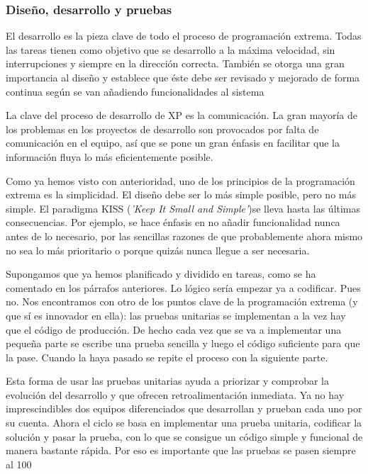 \documentclass[12pt]{book} %
\begin{document}
		\subsubsection{Diseño, desarrollo y pruebas}
			El desarrollo es la pieza clave de todo el proceso de programación extrema. Todas las tareas tienen como objetivo que se
			desarrollo a la máxima velocidad, sin 	interrupciones y siempre en la dirección correcta. 
			También se otorga una gran importancia al diseño y establece que éste debe ser revisado y mejorado de forma continua según se
			van añadiendo funcionalidades al sistema
			
			La clave del proceso de desarrollo de XP es la comunicación. La gran mayoría de los problemas en los proyectos de desarrollo son
			provocados por falta de comunicación en el equipo, así que se pone un gran énfasis en facilitar que la información fluya lo más
			eficientemente posible. 
			
			Como ya hemos visto con anterioridad, uno de los principios de la programación extrema es la simplicidad. El diseño debe ser lo
			más simple posible, pero no más simple. El paradigma KISS (\textit{'Keep It Small and Simple'})se lleva hasta las últimas 
			consecuencias. Por ejemplo, se hace énfasis en no añadir funcionalidad nunca antes de lo necesario, por las sencillas razones 
			de que probablemente ahora mismo no sea lo más prioritario o porque quizás nunca llegue a ser necesaria.
			
			
			Supongamos que ya hemos planificado y dividido en tareas, como se ha comentado en los párrafos anteriores. Lo lógico sería
			empezar ya a codificar. Pues no. Nos encontramos con otro de los puntos clave de la programación extrema (y que sí es innovador
			en ella): las pruebas unitarias se implementan a la vez hay que el código de producción. De hecho cada vez que se va a
			implementar una pequeña parte se escribe una prueba sencilla y luego el código suficiente para que la pase. Cuando la haya
			pasado se repite el proceso con la siguiente parte.
			
			Esta forma de usar las pruebas unitarias ayuda a priorizar y comprobar la evolución del desarrollo y que ofrecen 
			retroalimentación inmediata. Ya no hay imprescindibles dos equipos diferenciados que desarrollan y prueban cada uno por su
			cuenta. Ahora el ciclo se  basa en implementar una prueba unitaria, codificar la solución y pasar la prueba, con lo que se
			consigue un código simple y funcional de manera bastante rápida. Por eso es importante que las pruebas se pasen siempre al 100%
			
\end{document}
